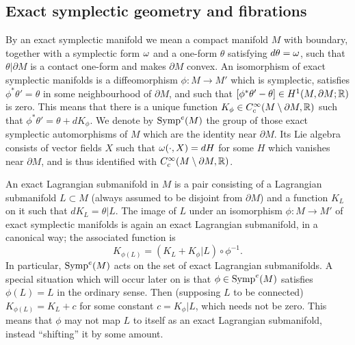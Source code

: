 \documentclass[10pt,letterpaper]{article}
\begin{document}
\subsection{Exact symplectic geometry and fibrations\label{sec:basic}}

By an exact symplectic manifold we mean a compact manifold $M$ with boundary,
together with a symplectic form $\omega$ and a one-form $\theta$ satisfying
$d\theta = \omega$, such that $\theta|\partial M$ is a contact one-form and makes
$\partial M$ convex. An isomorphism of exact symplectic manifolds is a
diffeomorphism $\phi: M \rightarrow M'$ which is symplectic, satisfies
$\phi^*\theta' = \theta$ in some neighbourhood of $\partial M$, and such that
$[\phi^*\theta' - \theta] \in H^1(M,\partial M;\mathbb{R})$ is zero. This means that
there is a unique function $K_\phi \in C^\infty_c(M \setminus \partial M,\mathbb{R})$
such that $\phi^*\theta' = \theta + dK_\phi$. We denote by $\mathrm{Symp}^e(M)$ the
group of those exact symplectic automorphisms of $M$ which are the identity
near $\partial M$. Its Lie algebra consists of vector fields $X$ such that
$\omega(\cdot,X) = dH$ for some $H$ which vanishes near $\partial M$, and is thus
identified with $C^\infty_c(M \setminus \partial M,\mathbb{R})$.

An exact Lagrangian submanifold in $M$ is a pair consisting of a Lagrangian
submanifold $L \subset M$ (always assumed to be disjoint from $\partial M$) and
a function $K_L$ on it such that $dK_L = \theta|L$. The image of $L$ under an
isomorphism $\phi: M \rightarrow M'$ of exact symplectic manifolds is again an
exact Lagrangian submanifold, in a canonical way; the associated function is
\begin{equation} \label{eq:induced-k}
K_{\phi(L)} = (K_L + K_\phi|L) \circ \phi^{-1}.
\end{equation}
In particular, $\mathrm{Symp}^e(M)$ acts on the set of exact Lagrangian submanifolds. A
special situation which will occur later on is that $\phi \in \mathrm{Symp}^e(M)$
satisfies $\phi(L) = L$ in the ordinary sense. Then (supposing $L$ to be
connected) $K_{\phi(L)} = K_L + c$ for some constant $c = K_\phi|L$, which
needs not be zero. This means that $\phi$ may not map $L$ to itself as an exact
Lagrangian submanifold, instead ``shifting'' it by some amount.
\end{document}
